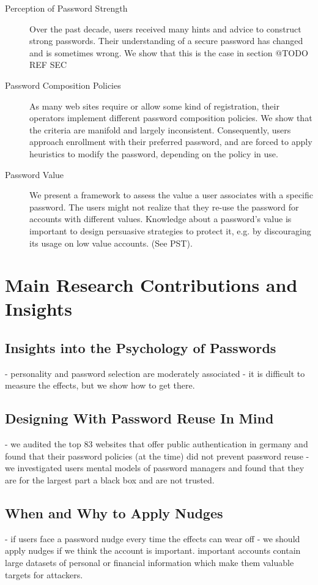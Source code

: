 \begin{description}
\item[Perception of Password Strength] Over the past decade, users received many hints and advice to construct strong passwords. Their understanding of a secure password has changed and is sometimes wrong. We show that this is the case in section @TODO REF SEC

\item[Password Composition Policies] As many web sites require or allow some kind of registration, their operators implement different password composition policies. We show that the criteria are manifold and largely inconsistent. Consequently, users approach enrollment with their preferred password, and are forced to apply heuristics to modify the password, depending on the policy in use. 

\item[Password Value] We present a framework to assess the value a user associates with a specific password. The users might not realize that they re-use the password for accounts with different values. Knowledge about a password's value is important to design persuasive strategies to protect it, e.g. by discouraging its usage on low value accounts. (See PST).
\end{description}


\section{Main Research Contributions and Insights}
\subsection{Insights into the Psychology of Passwords}
- personality and password selection are moderately associated
- it is difficult to measure the effects, but we show how to get there.

\subsection{Designing With Password Reuse In Mind}
- we audited the top 83 websites that offer public authentication in germany and found that their password policies (at the time) did not prevent password reuse
- we investigated users mental models of password managers and found that they are for the largest part a black box and are not trusted.

\subsection{When and Why to Apply Nudges}
- if users face a password nudge every time the effects can wear off 
- we should apply nudges if we think the account is important. important accounts contain large datasets of personal or financial information which make them valuable targets for attackers.

